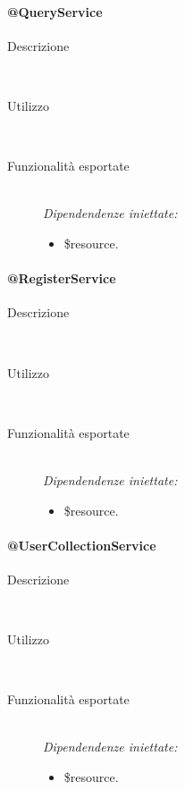 \paragraph{@QueryService}
\begin{description}
 \item[Descrizione] \hfill \\
 \item[Utilizzo] \hfill \\
  
 \item[Funzionalità esportate] \hfill \\
 \emph{Dipendendenze iniettate:}
 \begin{itemize}
  \item \$resource.
 \end{itemize}
\end{description}

\paragraph{@RegisterService}
\begin{description}
 \item[Descrizione] \hfill \\
 
 \item[Utilizzo] \hfill \\
  
 \item[Funzionalità esportate] \hfill \\
 \emph{Dipendendenze iniettate:}
 \begin{itemize}
  \item \$resource.
 \end{itemize}
\end{description}

\paragraph{@UserCollectionService}
\begin{description}
 \item[Descrizione] \hfill \\
 
 \item[Utilizzo] \hfill \\
  
 \item[Funzionalità esportate] \hfill \\
 \emph{Dipendendenze iniettate:}
 \begin{itemize}
  \item \$resource.
 \end{itemize}
\end{description}

